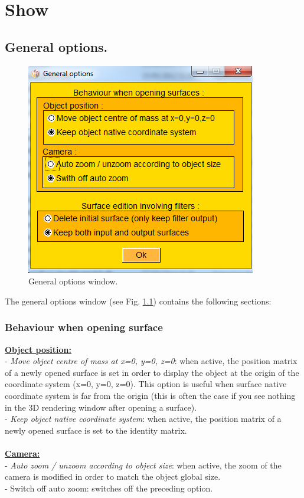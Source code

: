 
\chapter{Show}
\minitoc 


\section{General options.} 
\begin{figure}
  \centering
  \includegraphics[scale=0.5]{images/Show/General_options_window.png} 
	\caption{General options window.}
\label{general_options_window}
 
\end{figure}


The general options window (see Fig. \ref{general_options_window}) contains the following sections:
\subsection{Behaviour when opening surface}
\textbf{\underline{Object position:}}\\
- \textit{Move object centre of mass at x=0, y=0, z=0}: when active,
the position matrix of a newly opened surface is set in
order to display the object at the origin of the coordinate
system (x=0, y=0, z=0). This option is useful when surface
native coordinate system is far from the origin (this is often
the case if you see nothing in the 3D rendering window
after opening a surface).\\
- \textit{Keep object native coordinate system}: when active, the
position matrix of a newly opened surface is set to the identity matrix.\\\\
\noindent
\textbf{\underline{Camera:}}\\
- \textit{Auto zoom / unzoom according to object size}: when active, the zoom of the camera is modified in
order to match the object global size.\\
- Switch off auto zoom: switches off the preceding option.
 

